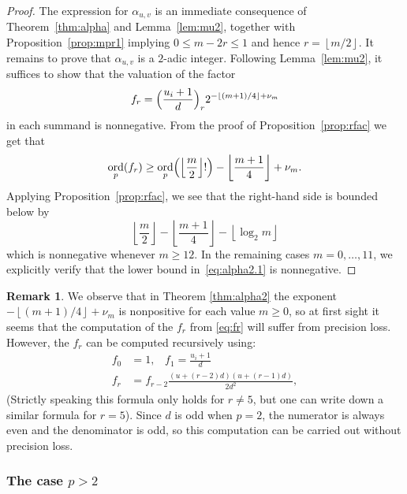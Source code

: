 \documentclass[a4paper,11pt]{article}
\numberwithin{equation}{section}
\providecommand{\floor}[1]{\left\lfloor#1\right\rfloor}   %
\DeclareMathOperator{\ord}{ord}          %
\theoremstyle{definition}
\newtheorem{rem}[thm]{Remark}
\begin{document}
\begin{proof}
The expression for $\alpha_{u,v}$ is an immediate consequence 
of Theorem~\ref{thm:alpha} and Lemma~\ref{lem:mu2}, together with 
Proposition~\ref{prop:mpr1} implying $0 \leq m - 2r \leq 1$ and 
hence $r = \floor{m/2}$.  It remains to prove that 
$\alpha_{u,v}$ is a $2$-adic integer.  Following Lemma~\ref{lem:mu2}, 
it suffices to show that the valuation of the factor 
\begin{equation} \label{eq:fr}
f_r=\Bigl(\frac{u_i+1}{d}\Bigr)_r 2^{- \floor{(m+1)/4} + \nu_m}
\end{equation}
in each summand is nonnegative.  From the proof of 
Proposition~\ref{prop:rfac} we get that 
\begin{equation} \label{eq:alpha2.1}
\ord_p(f_r)
\geq \ord_p\Bigl(\floor{\frac{m}{2}}!\Bigr) - \floor{\frac{m+1}{4}} + \nu_m.
\end{equation}
Applying Proposition~\ref{prop:rfac}, we see that the right-hand side 
is bounded below by 
\begin{equation*}
\floor{\frac{m}{2}} - \floor{\frac{m+1}{4}} - \floor{\log_2 m}
\end{equation*}
which is nonnegative whenever $m \geq 12$.  In the remaining 
cases $m = 0, \dotsc, 11$, we explicitly verify that the 
lower bound in~\eqref{eq:alpha2.1} is nonnegative.
\end{proof}

\begin{rem}
We observe that in Theorem \ref{thm:alpha2} the exponent 
$-\floor{(m+1)/4}+\nu_m$ is nonpositive for each value $m \geq 0$, 
so at first sight it seems that the computation of the $f_r$ from
\eqref{eq:fr} will suffer from precision loss. However, the $f_r$
can be computed recursively using:
\begin{align*}
f_0 &=1, \; \; \; f_1=\frac{u_i+1}{d} \\
f_r & = f_{r-2} \frac{(u + (r - 2)d)(u + (r - 1)d)}{2d^2} ,
\end{align*}
(Strictly speaking this formula only holds for $r \neq 5$, but one can write down a similar formula for $r=5$).
Since $d$ is odd when $p=2$, the numerator is always even and the denominator is odd,
so this computation can be carried out without precision loss.
\end{rem}

\subsubsection{The case $p > 2$}
\end{document}
